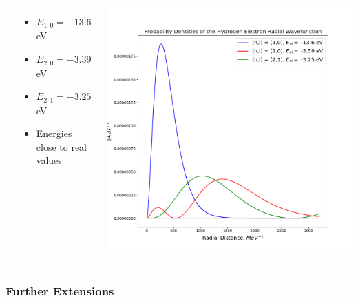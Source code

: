 \documentclass[10pt,usenames,dvipsnames]{beamer}
\begin{document}
\begin{frame}
\begin{columns}[c]
\begin{itemize}
        \end{itemize}
        \begin{itemize}
            \item $E_{1,0} = -13.6\,$eV
            \item $E_{2,0} = -3.39\,$eV
            \item $E_{2,1} = -3.25\,$eV
            \item Energies close to real values
        \end{itemize}
        \begin{center}
            \includegraphics[scale=0.2]{images/probs.png}
        \end{center}
        \end{columns}
\end{frame}

\begin{frame}
    \frametitle{Further Extensions}
\end{frame}
\end{document}

